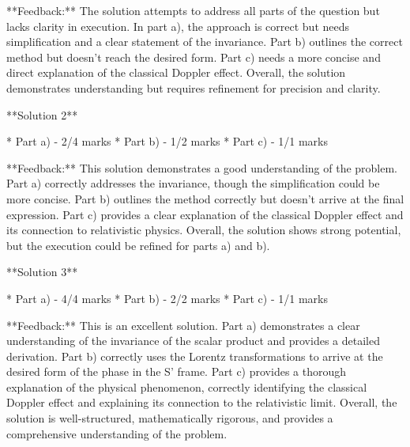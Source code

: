 \documentclass[a4paper,11pt]{article}
\begin{document}
**Feedback:** The solution attempts to address all parts of the question but lacks clarity in execution. In part a), the approach is correct but needs simplification and a clear statement of the invariance. Part b) outlines the correct method but doesn't reach the desired form. Part c) needs a more concise and direct explanation of the classical Doppler effect. Overall, the solution demonstrates understanding but requires refinement for precision and clarity.

**Solution 2**

*   Part a) - 2/4 marks
*   Part b) - 1/2 marks
*   Part c) - 1/1 marks

**Feedback:** This solution demonstrates a good understanding of the problem. Part a) correctly addresses the invariance, though the simplification could be more concise. Part b) outlines the method correctly but doesn't arrive at the final expression. Part c) provides a clear explanation of the classical Doppler effect and its connection to relativistic physics. Overall, the solution shows strong potential, but the execution could be refined for parts a) and b).

**Solution 3**

*   Part a) - 4/4 marks
*   Part b) - 2/2 marks
*   Part c) - 1/1 marks

**Feedback:** This is an excellent solution. Part a) demonstrates a clear understanding of the invariance of the scalar product and provides a detailed derivation. Part b) correctly uses the Lorentz transformations to arrive at the desired form of the phase in the S' frame. Part c) provides a thorough explanation of the physical phenomenon, correctly identifying the classical Doppler effect and explaining its connection to the relativistic limit. Overall, the solution is well-structured, mathematically rigorous, and provides a comprehensive understanding of the problem.
\end{document}

